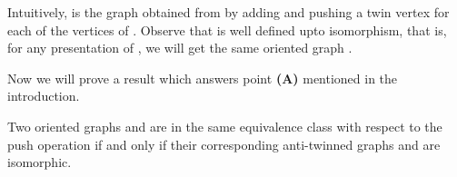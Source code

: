 \documentclass[10pt]{article}
\begin{document}
 
 
 


 
 
 
  Intuitively,  is the graph obtained from  by adding and pushing  a twin vertex   for each of the vertices  of . 
  Observe that  is well defined upto isomorphism, that is, for any presentation of 
  , we will get the same oriented graph . 
  

Now we will prove a result which answers point \textbf{(A)}
mentioned in the introduction.

 
 \begin{theorem}\label{corollary push and oriented}
Two oriented graphs  and   are in the same  equivalence class with respect to the push operation if and only if 
their corresponding anti-twinned graphs  and  are isomorphic.
 \end{theorem}
 
\end{document}
